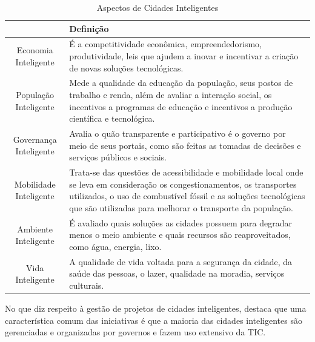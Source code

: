\begin{table}[h]
\centering
\caption{Aspectos de Cidades Inteligentes}
\label{tab:tabela1}
\vspace{0.0cm}
\begin{tabular}{cp{10cm}}
\hline
 & Definição \\
\hline
\vspace{0.05cm}
Economia Inteligente & 
É a competitividade econômica, empreendedorismo, produtividade, leis que ajudem a inovar e incentivar a criação de novas soluções tecnológicas. \\
\hline
\vspace{0.05cm}
População Inteligente & 
Mede a qualidade da educação da população, seus postos de trabalho e renda, além de avaliar a interação social, os incentivos a programas de educação e incentivos a produção científica e tecnológica. \\
\hline
\vspace{0.05cm}
Governança Inteligente & Avalia o quão transparente e participativo é o governo por meio de seus portais, como são feitas as tomadas de decisões e serviços públicos e sociais.\\
\hline
\vspace{0.05cm}
Mobilidade Inteligente & Trata-se das questões de acessibilidade e mobilidade local onde se leva em consideração os congestionamentos, os transportes utilizados, o uso de combustível fóssil e as soluções tecnológicas que são utilizadas para melhorar o transporte da população.
 \\
\hline
\vspace{0.05cm}
Ambiente Inteligente &
É avaliado quais soluções as cidades possuem para degradar menos o meio ambiente e quais recursos são reaproveitados, como água, energia, lixo.
\\
\hline
Vida Inteligente &
A qualidade de vida voltada para a segurança da cidade, da saúde das pessoas, o lazer, qualidade na moradia, serviços culturais.

\end{tabular}
\end{table}

No que diz respeito à gestão de projetos de cidades inteligentes,  destaca que uma característica comum das iniciativas é que a maioria das cidades inteligentes são gerenciadas e organizadas por governos e fazem uso extensivo da TIC.

